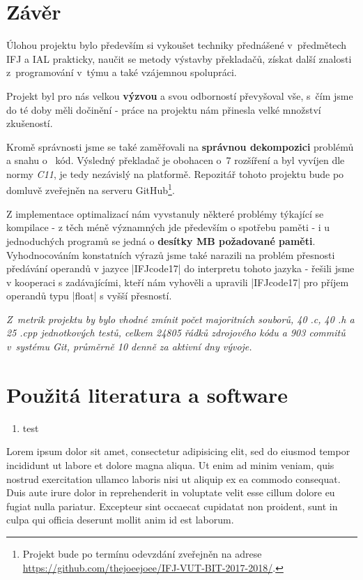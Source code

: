 \section{Závěr}
Úlohou projektu bylo především si vykoušet techniky přednášené v~předmětech IFJ a IAL prakticky,
naučit se metody výstavby překladačů, získat další znalosti z~programování v~týmu a také vzájemnou spolupráci.

Projekt byl pro nás velkou \textbf{výzvou} a svou odborností převyšoval vše, s~čím jsme do té doby měli dočinění - práce na projektu nám přinesla velké množství zkušeností.

Kromě správnosti jsme se také zaměřovali na \textbf{správnou dekompozici} problémů a snahu o~ kód. Výsledný překladač je obohacen o~7 rozšíření a byl vyvíjen dle normy \emph{C11}, je tedy nezávislý na platformě. Repozitář tohoto projektu bude po domluvě zveřejněn na serveru GitHub\footnote{Projekt bude po termínu odevzdání zveřejněn na adrese \href{https://github.com/thejoeejoee/IFJ-VUT-BIT-2017-2018/}{https://github.com/thejoeejoee/IFJ-VUT-BIT-2017-2018/}.}.

Z implementace optimalizací nám vyvstanuly některé problémy týkající se kompilace - z těch méně významných jde především o spotřebu paměti - i u jednoduchých programů se jedná o \textbf{desítky MB požadované paměti}. Vyhodnocováním konstatních výrazů jsme také narazili na problém přesnosti předávání operandů v jazyce \ic|IFJcode17| do interpretu tohoto jazyka - řešili jsme v kooperaci s zadávajícími, kteří nám vyhověli a upravili \ic|IFJcode17| pro příjem operandů typu \ic|float| s vyšší přesností.

\emph{
	Z~metrik projektu by bylo vhodné zmínit počet majoritních souborů, 40 .c, 40 .h a 25 .cpp jednotkových testů, celkem \emph{24805} řádků zdrojového kódu a \emph{903} commitů v~systému \emph{Git}, průměrně \emph{10} denně za aktivní dny vývoje.
}

\vfill
\section{Použitá literatura a software}
\begin{enumerate}[label=\arabic*]
	\item test
\end{enumerate}

Lorem ipsum dolor sit amet, consectetur adipisicing elit, sed do eiusmod
tempor incididunt ut labore et dolore magna aliqua. Ut enim ad minim veniam,
quis nostrud exercitation ullamco laboris nisi ut aliquip ex ea commodo
consequat. Duis aute irure dolor in reprehenderit in voluptate velit esse
cillum dolore eu fugiat nulla pariatur. Excepteur sint occaecat cupidatat non
proident, sunt in culpa qui officia deserunt mollit anim id est laborum.